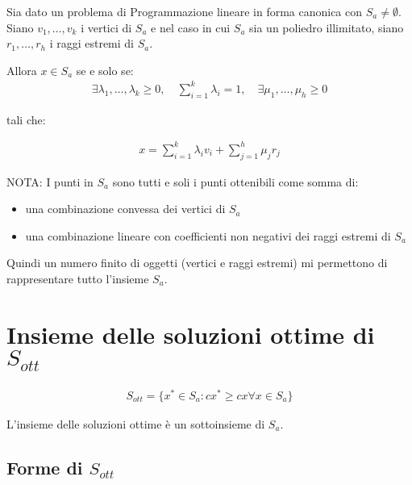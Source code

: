 Sia dato un problema di Programmazione lineare in forma canonica con $S_a \neq \emptyset$.
Siano $v_1, \dots, v_k$ i vertici di $S_a$ e nel caso in cui $S_a$ sia un poliedro illimitato, siano $r_1, \dots, r_h$ i raggi estremi di $S_a$.

Allora $x \in S_a$ se e solo se:
\begin{align}
	\exists \lambda_1, \dots, \lambda_k \geq 0, \quad \sum_{i=1}^k \lambda_i = 1, \quad \exists \mu_1, \dots, \mu_h \geq 0
\end{align}

tali che:

\begin{align}
	x = \sum_{i=1}^k \lambda_i v_i + \sum_{j=1}^h \mu_j r_j
\end{align}

NOTA:
I punti in $S_a$ sono tutti e soli i punti ottenibili come somma di:
\begin{itemize}
	\item una combinazione convessa dei vertici di $S_a$
	\item una combinazione lineare con coefficienti non negativi dei raggi estremi di $S_a$
\end{itemize}
Quindi un numero finito di oggetti (vertici e raggi estremi) mi permettono di rappresentare tutto l’insieme $S_a$.



\section{Insieme delle soluzioni ottime di $S_{ott}$}

\begin{align}
	S_{ott} = \{ x^* \in S_a : cx^* \geq cx \forall x \in S_a \}
\end{align}

L'insieme delle soluzioni ottime è un sottoinsieme di $S_a$.


\subsection{Forme di $S_{ott}$}

